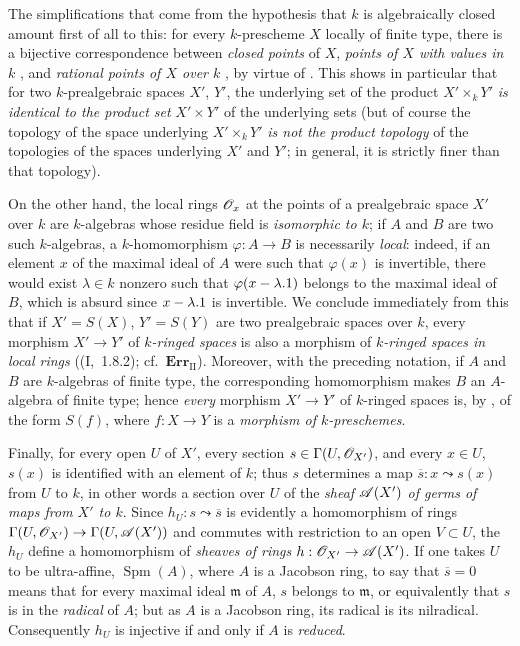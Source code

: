 \begin{env}[10.10.3]
\label{IV.10.10.3}
The simplifications that come from the hypothesis that $k$ is algebraically closed amount first of all to this: for every $k$-prescheme $X$ locally of finite type, there is a bijective correspondence between \emph{closed points} of $X$, \emph{points of $X$ with values in $k$} , and \emph{rational points of $X$ over $k$} , by virtue of .
This shows in particular  that for two $k$-prealgebraic spaces $X'$, $Y'$, the underlying set of the product $X'\times_kY'$ \emph{is identical to the product set} $X'\times Y'$ of the underlying sets (but of course the topology of the space underlying $X'\times_kY'$ \emph{is not the product topology} of the topologies of the spaces underlying $X'$ and $Y'$; in general, it is strictly finer than that topology).

On the other hand, the local rings $\mathscr{O}_x$ at the points of a prealgebraic space $X'$ over $k$ are $k$-algebras whose residue field is \emph{isomorphic to $k$}; if $A$ and $B$ are two such $k$-algebras, a $k$-homomorphism $\varphi:A\to B$ is necessarily \emph{local}: indeed, if an element $x$ of the maximal ideal of $A$ were such that $\varphi(x)$ is invertible, there would exist $\lambda\in k$ nonzero such that $\varphi(x-\lambda.1)$ belongs to the maximal ideal of $B$, which is absurd since $x-\lambda.1$ is invertible.
We conclude immediately from this that if $X'=S(X)$, $Y'=S(Y)$ are two prealgebraic spaces over $k$, every morphism $X'\to Y'$ of \emph{$k$-ringed spaces} is also a morphism of \emph{$k$-ringed spaces in local rings} ((I,~1.8.2); cf.\ $\mathbf{Err}_{\mathrm{II}}$). Moreover, with the preceding notation, if $A$ and $B$ are $k$-algebras of finite type, the corresponding homomorphism makes $B$ an $A$-algebra of finite type; hence \emph{every} morphism $X'\to Y'$ of $k$-ringed spaces is, by , of the form $S(f)$, where $f:X\to Y$ is a \emph{morphism of $k$-preschemes}.

Finally, for every open $U$ of $X'$, every section $s\in\Gamma(U,\mathscr{O}_{X'})$, and every $x\in U$, $s(x)$  is identified with an element of $k$; thus $s$ determines a map $\overline{s}:x\leadsto s(x)$ from $U$ to $k$, in other words a section over $U$ of the \emph{sheaf $\mathscr{A}(X')$ of germs of maps from $X'$ to $k$}. Since $h_U:s\leadsto\overline{s}$ is evidently a homomorphism of rings $\Gamma(U,\mathscr{O}_{X'})\to\Gamma(U,\mathscr{A}(X'))$ and commutes with restriction to an open $V\subset U$, the $h_U$ define a homomorphism of \emph{sheaves of rings} $h:\mathscr{O}_{X'}\to\mathscr{A}(X')$.
If one takes $U$ to be ultra-affine, $\operatorname{Spm}(A)$, where $A$ is a Jacobson ring, to say that $\overline{s}=0$ means that for every maximal ideal $\mathfrak{m}$ of $A$, $s$ belongs to $\mathfrak{m}$, or equivalently that $s$ is in the \emph{radical} of $A$; but as $A$ is a Jacobson ring, its radical is its nilradical. Consequently $h_U$ is injective if and only if $A$ is \emph{reduced}.
\end{env}

